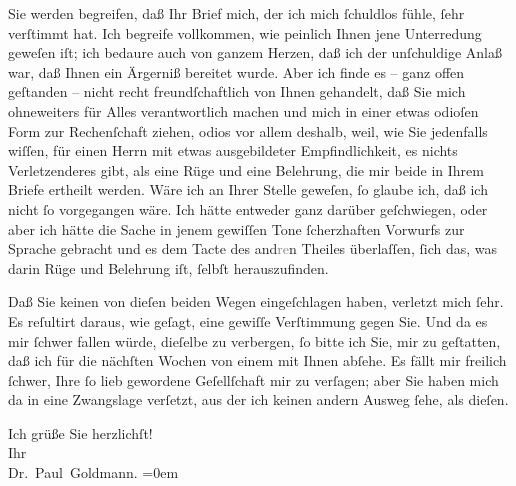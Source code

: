 \pstart
           Sie werden begreifen, daß Ihr Brief mich, der ich mich{ }ſchuldlos fühle,{ }ſehr
               verſtimmt hat. Ich begreife vollkommen, wie peinlich Ihnen jene Unterredung geweſen
               iſt; ich bedaure auch von ganzem Herzen, daß ich der unſchuldige Anlaß war, daß Ihnen
               ein Ärgerniß bereitet wurde. Aber ich finde es – ganz offen geſtanden – {\pb}nicht recht freundſchaftlich von Ihnen gehandelt,
               daß Sie mich ohneweiters für Alles verantwortlich machen und mich in einer etwas
               odioſen Form zur Rechenſchaft ziehen, odios vor allem deshalb, weil, wie Sie
               jedenfalls wiſſen, \strikeout{\textcolor{gray}{e}}für einen Herrn mit etwas ausgebildeter Empfindlichkeit, es nichts
               Verletzenderes gibt, als eine Rüge und eine Belehrung, die mir beide in Ihrem Briefe
               ertheilt werden. Wäre ich an Ihrer Stelle geweſen,{ }ſo glaube ich, daß ich nicht{ }ſo
               vorgegangen wäre. Ich hätte entweder ganz darüber geſchwiegen, oder aber ich hätte
               die Sache in jenem gewiſſen Tone{ }ſcherzhaften Vorwurfs zur Sprache gebracht und es
               dem Tacte des and\textcolor{gray}{re}n Theiles überlaſſen,{ }ſich das, was darin Rüge
               und Belehrung iſt,{ }ſelbſt herauszufinden.\pend
           
\pstart
           Daß Sie  keinen von dieſen beiden Wegen
               eingeſchlagen haben, verletzt mich{ }ſehr. Es reſultirt daraus, wie geſagt, eine
               gewiſſe Verſtimmung gegen Sie. Und da es mir{ }ſchwer fallen würde, dieſelbe zu
               verbergen,{ }ſo bitte ich Sie, \strikeout{\textcolor{gray}{d}} mir zu geſtatten, daß ich für die nächſten Wochen von einem {\pb}\label{K_L02646-1v}\label{K_L02646-1}
               mit Ihnen abſehe. Es fällt mir freilich{ }ſchwer, Ihre{ }ſo lieb gewordene Geſellſchaft
               mir zu verſagen; aber Sie haben mich da in eine Zwangslage verſetzt, aus der ich
               keinen andern Ausweg{ }ſehe, als dieſen.\pend
           
\pstart
           Ich grüße Sie herzlichſt! {\\[\baselineskip]}Ihr {\\[\baselineskip]}\spacefill\mbox{Dr. Paul Goldmann.}\pend
           \leftskip=0em{}\endnumbering{}  \newcommand{\dateiname}{L02646}\newcommand{\titel}{Paul Goldmann an Arthur Schnitzler, 6. 12. 1889}\newcommand{\editorInnen}{Martin Anton Müller und Laura Untner}
